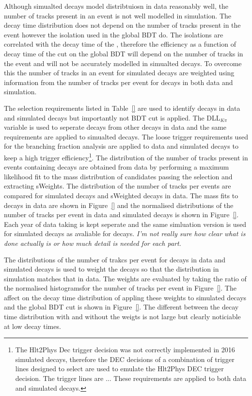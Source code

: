 Although simualted decays model distribtuiosn in data reasonably well, the number of tracks present in an event is not well modelled in simulation. %
The \bs decay time distribution does not depend on the number of tracks present in the event however the isolation used in the global BDT do. The isolations are correlated with the decay time of the \bs, therefore the efficiency as a function of decay time of the cut on the global BDT will depend on the number of tracks in the event and will not be accurately modelled in simualted decays.  
To overcome this the number of tracks in an event for simulated \bsmumu decays are weighted using information from the number of tracks per event for \bdkpi decays in both data and simulation. 

The selection requirements listed in Table~\ref{} are used to identify \bdkpi decays in data and simulated decays but importantly not BDT cut is applied. The DLL$_{K\pi}$ variable is used to seperate \bdkpi decays from other \bhh decays in data and the same requirements are applied to simualted decays. The loose trigger requirements used for the branching fraction analysis are applied to data and simulated decays to keep a high trigger efficiency\footnote{The Hlt2Phys Dec trigger decision was not correctly implemented in 2016 simulated decays, therefore the DEC decisions of a combination of trigger lines designed to select \bhh are used to emulate the Hlt2Phys DEC trigger decision. The trigger lines are ... These requirements are applied to both data and simulated decays.}. The distribution of the number of tracks present in events containing \bdkpi decays are obtained from data by performing a maximum likelihood fit to the \bd mass distribution of candidates passing the selection and extracting sWeights. The distribution of the number of tracks per events are compared for simulated \bdkpi decays and sWeighted \bdkpi decays in data. The mass fits to \bdkpi decays in data are shown in Figure~\ref{} and the normalised distributions of the number of tracks per event in data and simulated decays is shown in Figure~\ref{}. Each year of data taking is kept seperate and the same simluation version is used for \bdkpi simulated decays as avaliable for \bsmumu decays.
{\it I'm not really sure how clear what is done actually is or how much detail is needed for each part.} 


The distributions of the number of trakcs per event for \bdkpi decays in data and simulated decays is used to weight the \bdkpi decays so that the distribution in simulation matches that in data. The weights are evaluated by taking the ratio of the normalised histogramsfor the number of tracks per event in Figure~\ref{}. The affect on the decay time distribution of appling these weights to \bdkpi simulated decays and the global BDT cut is shown in Figure~\ref{}. The different between the decay time distribution with and without the weigts is not large but clearly noticiable at low decay times. 

